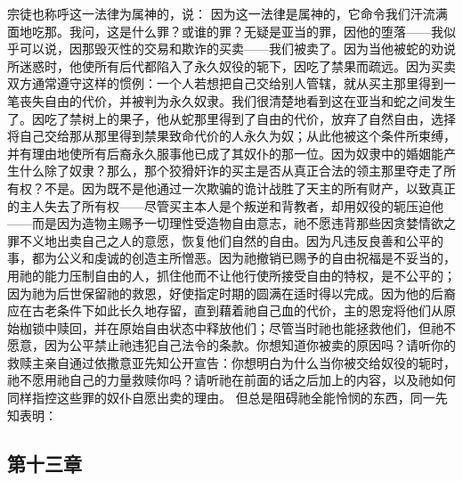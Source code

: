 宗徒也称呼这一法律为属神的，说： 因为这一法律是属神的，它命令我们汗流满面地吃那。我问，这是什么罪？或谁的罪？无疑是亚当的罪，因他的堕落——我似乎可以说，因那毁灭性的交易和欺诈的买卖——我们被卖了。因为当他被蛇的劝说所迷惑时，他使所有后代都陷入了永久奴役的轭下，因吃了禁果而疏远。因为买卖双方通常遵守这样的惯例：一个人若想把自己交给别人管辖，就从买主那里得到一笔丧失自由的代价，并被判为永久奴隶。我们很清楚地看到这在亚当和蛇之间发生了。因吃了禁树上的果子，他从蛇那里得到了自由的代价，放弃了自然自由，选择将自己交给那从那里得到禁果致命代价的人永久为奴；从此他被这个条件所束缚，并有理由地使所有后裔永久服事他已成了其奴仆的那一位。因为奴隶中的婚姻能产生什么除了奴隶？那么，那个狡猾奸诈的买主是否从真正合法的领主那里夺走了所有权？不是。因为既不是他通过一次欺骗的诡计战胜了天主的所有财产，以致真正的主人失去了所有权——尽管买主本人是个叛逆和背教者，却用奴役的轭压迫他——而是因为造物主赐予一切理性受造物自由意志，祂不愿违背那些因贪婪情欲之罪不义地出卖自己之人的意愿，恢复他们自然的自由。因为凡违反良善和公平的事，都为公义和虔诚的创造主所憎恶。因为祂撤销已赐予的自由祝福是不妥当的，用祂的能力压制自由的人，抓住他而不让他行使所接受自由的特权，是不公平的；因为祂为后世保留祂的救恩，好使指定时期的圆满在适时得以完成。因为他的后裔应在古老条件下如此长久地存留，直到藉着祂自己血的代价，主的恩宠将他们从原始枷锁中赎回，并在原始自由状态中释放他们；尽管当时祂也能拯救他们，但祂不愿意，因为公平禁止祂违犯自己法令的条款。你想知道你被卖的原因吗？请听你的救赎主亲自通过依撒意亚先知公开宣告：你想明白为什么当你被交给奴役的轭时，祂不愿用祂自己的力量救赎你吗？请听祂在前面的话之后加上的内容，以及祂如何同样指控这些罪的奴仆自愿出卖的理由。 但总是阻碍祂全能怜悯的东西，同一先知表明：\par


\subsection{第十三章}

\par

